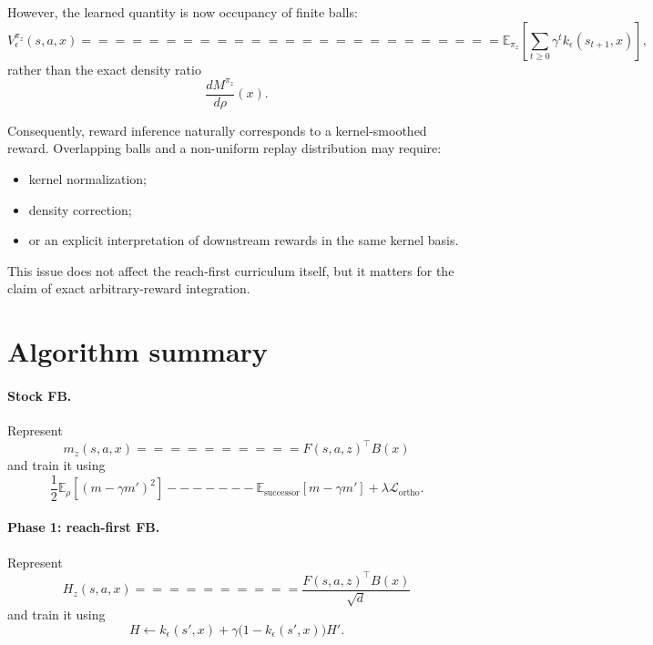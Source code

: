 \documentclass[10pt]{article}
\newcommand{\E}{\mathbb{E}}
\begin{document}
However, the learned quantity is now occupancy of finite balls:
\begin{equation}
V_\epsilon^{\pi_z}(s,a,x)
=========================

\E_{\pi_z}
\left[
\sum_{t\geq0}
\gamma^t
k_\epsilon(s_{t+1},x)
\right],
\end{equation}
rather than the exact density ratio
\begin{equation}
\frac{dM^{\pi_z}}{d\rho}(x).
\end{equation}

Consequently, reward inference naturally corresponds to a kernel-smoothed reward.
Overlapping balls and a non-uniform replay distribution may require:
\begin{itemize}
\item kernel normalization;
\item density correction;
\item or an explicit interpretation of downstream rewards in the same kernel basis.
\end{itemize}

This issue does not affect the reach-first curriculum itself, but it matters for the claim
of exact arbitrary-reward integration.

\section{Algorithm summary}

\paragraph{Stock FB.}
Represent
\begin{equation}
m_z(s,a,x)
==========

F(s,a,z)^\top B(x)
\end{equation}
and train it using
\begin{equation}
\frac{1}{2}
\E_\rho
\left[
(m-\gamma m')^2
\right]
-------

\E_{\mathrm{successor}}
[m-\gamma m']
+
\lambda\mathcal{L}_{\mathrm{ortho}}.
\end{equation}

\paragraph{Phase 1: reach-first FB.}
Represent
\begin{equation}
H_z(s,a,x)
==========

\frac{F(s,a,z)^\top B(x)}{\sqrt d}
\end{equation}
and train it using
\begin{equation}
H
\leftarrow
k_\epsilon(s',x)
+
\gamma
\bigl(1-k_\epsilon(s',x)\bigr)
H'.
\end{equation}
\end{document}
